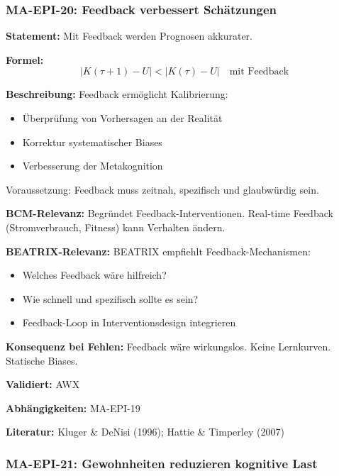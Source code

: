 \subsubsection*{MA-EPI-20: Feedback verbessert Schätzungen}

\textbf{Statement:} Mit Feedback werden Prognosen akkurater.

\textbf{Formel:}
\begin{equation}
|K(\tau+1) - U| < |K(\tau) - U| \quad \text{mit Feedback}
\end{equation}

\textbf{Beschreibung:}
Feedback ermöglicht Kalibrierung:
\begin{itemize}
    \item Überprüfung von Vorhersagen an der Realität
    \item Korrektur systematischer Biases
    \item Verbesserung der Metakognition
\end{itemize}
Voraussetzung: Feedback muss zeitnah, spezifisch und glaubwürdig sein.

\textbf{BCM-Relevanz:}
Begründet Feedback-Interventionen. Real-time Feedback (Stromverbrauch, Fitness) kann Verhalten ändern.

\textbf{BEATRIX-Relevanz:}
BEATRIX empfiehlt Feedback-Mechanismen:
\begin{itemize}
    \item Welches Feedback wäre hilfreich?
    \item Wie schnell und spezifisch sollte es sein?
    \item Feedback-Loop in Interventionsdesign integrieren
\end{itemize}

\textbf{Konsequenz bei Fehlen:}
Feedback wäre wirkungslos. Keine Lernkurven. Statische Biases.

\textbf{Validiert:} AWX

\textbf{Abhängigkeiten:} MA-EPI-19

\textbf{Literatur:} Kluger \& DeNisi (1996); Hattie \& Timperley (2007)


\subsubsection*{MA-EPI-21: Gewohnheiten reduzieren kognitive Last}

